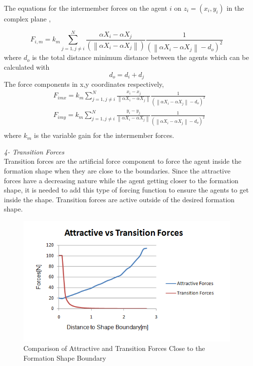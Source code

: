 \documentclass[twoside]{article}
\newcommand{\norm}[1]{\left\lVert#1\right\rVert}
\begin{document}
			The equations for the intermember forces on the agent $i$ on $z_i = (x_i, y_i)$  in the complex plane ,
			
			\begin{equation}
F_{i,m} = k_m \sum_{j=1, j\neq i}^{N}\frac{\alpha X_i - \alpha X_j}{(\norm{\alpha X_i - \alpha X_j})} \frac{1}{(\norm{\alpha X_i - \alpha X_j} - d_o)^2}
			\end{equation}
			where $d_o$ is the total distance minimum distance between the agents which can be calculated with
			\begin{equation}
 d_o = d_i + d_j
			\end{equation}
			The force components in x,y coordinates respectively,
			\begin{align*}
&F_{imx} = k_m \sum_{j=1, j\neq i}^{N}\frac{x_i- x_j}{\norm{\alpha X_i - \alpha X_j}}  \frac{1}{(\norm{\alpha X_i - \alpha X_j} - d_o)^2}\\
&F_{imy} = k_m \sum_{j=1, j\neq i}^{N}\frac{y_i- y_j}{\norm{\alpha X_i - \alpha X_j}}  \frac{1}{(\norm{\alpha X_i - \alpha X_j} - d_o)^2}\\
			\end{align*}
			where $k_m$ is the variable gain for the intermember forces.  \newline
			
					\textit{4- Transition Forces} \\ 
			
			
			Transition forces are the artificial force component to force the agent inside the formation shape when they are close to the boundaries. Since the attractive forces have a decreasing nature while the agent getting closer to the formation shape, it is needed to add this type of forcing function to ensure the agents to get inside the shape. Transition forces are active outside of the desired formation shape.
			
				\begin{figure}[H]
					\caption{Comparison of Attractive and Transition Forces Close to the Formation Shape Boundary}
					\centering
					\includegraphics[scale = 0.80]{transition_forces}
				\end{figure}
			
\end{document}
